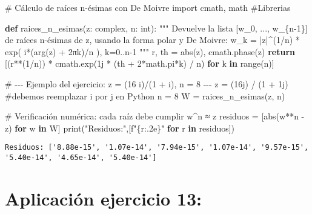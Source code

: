 \documentclass[
  letterpaper,
  DIV=11,
  numbers=noendperiod]{scrreprt}
\newenvironment{Shaded}{\begin{snugshade}}{\end{snugshade}}
\newcommand{\BuiltInTok}[1]{\textcolor[rgb]{0.00,0.23,0.31}{#1}}
\newcommand{\CommentTok}[1]{\textcolor[rgb]{0.37,0.37,0.37}{#1}}
\newcommand{\ControlFlowTok}[1]{\textcolor[rgb]{0.00,0.23,0.31}{\textbf{#1}}}
\newcommand{\DecValTok}[1]{\textcolor[rgb]{0.68,0.00,0.00}{#1}}
\newcommand{\ImportTok}[1]{\textcolor[rgb]{0.00,0.46,0.62}{#1}}
\newcommand{\KeywordTok}[1]{\textcolor[rgb]{0.00,0.23,0.31}{\textbf{#1}}}
\newcommand{\NormalTok}[1]{\textcolor[rgb]{0.00,0.23,0.31}{#1}}
\newcommand{\OperatorTok}[1]{\textcolor[rgb]{0.37,0.37,0.37}{#1}}
\newcommand{\OtherTok}[1]{\textcolor[rgb]{0.00,0.23,0.31}{#1}}
\newcommand{\SpecialCharTok}[1]{\textcolor[rgb]{0.37,0.37,0.37}{#1}}
\newcommand{\SpecialStringTok}[1]{\textcolor[rgb]{0.13,0.47,0.30}{#1}}
\newcommand{\StringTok}[1]{\textcolor[rgb]{0.13,0.47,0.30}{#1}}
\begin{document}
\begin{Shaded}
\begin{Highlighting}[]
\CommentTok{\# Cálculo de raíces n{-}ésimas con De Moivre}
\ImportTok{import}\NormalTok{ cmath, math }\CommentTok{\#Librerias}

\KeywordTok{def}\NormalTok{ raices\_n\_esimas(z: }\BuiltInTok{complex}\NormalTok{, n: }\BuiltInTok{int}\NormalTok{):}
    \CommentTok{"""}
\CommentTok{    Devuelve la lista [w\_0, ..., w\_\{n{-}1\}] de raíces n{-}ésimas de z,}
\CommentTok{    usando la forma polar y De Moivre:}
\CommentTok{       w\_k = |z|\^{}(1/n) * exp( i*(arg(z) + 2πk)/n ),  k=0..n{-}1}
\CommentTok{    """}
\NormalTok{    r, th }\OperatorTok{=} \BuiltInTok{abs}\NormalTok{(z), cmath.phase(z)}
    \ControlFlowTok{return}\NormalTok{ [(r}\OperatorTok{**}\NormalTok{(}\DecValTok{1}\OperatorTok{/}\NormalTok{n)) }\OperatorTok{*}\NormalTok{ cmath.exp(}\OtherTok{1j} \OperatorTok{*}\NormalTok{ (th }\OperatorTok{+} \DecValTok{2}\OperatorTok{*}\NormalTok{math.pi}\OperatorTok{*}\NormalTok{k) }\OperatorTok{/}\NormalTok{ n) }\ControlFlowTok{for}\NormalTok{ k }\KeywordTok{in} \BuiltInTok{range}\NormalTok{(n)]}

\CommentTok{\# {-}{-}{-} Ejemplo del ejercicio: z = (16 i)/(1 + i), n = 8 {-}{-}{-}}
\NormalTok{z }\OperatorTok{=}\NormalTok{ (}\OtherTok{16j}\NormalTok{) }\OperatorTok{/}\NormalTok{ (}\DecValTok{1} \OperatorTok{+} \OtherTok{1j}\NormalTok{) }\CommentTok{\#debemos reemplazar i por j en Python}
\NormalTok{n }\OperatorTok{=} \DecValTok{8}
\NormalTok{W }\OperatorTok{=}\NormalTok{ raices\_n\_esimas(z, n)}

\CommentTok{\# Verificación numérica: cada raíz debe cumplir w\^{}n ≈ z}
\NormalTok{residuos }\OperatorTok{=}\NormalTok{ [}\BuiltInTok{abs}\NormalTok{(w}\OperatorTok{**}\NormalTok{n }\OperatorTok{{-}}\NormalTok{ z) }\ControlFlowTok{for}\NormalTok{ w }\KeywordTok{in}\NormalTok{ W]}
\BuiltInTok{print}\NormalTok{(}\StringTok{"Residuos:"}\NormalTok{,[}\SpecialStringTok{f"}\SpecialCharTok{\{}\NormalTok{r}\SpecialCharTok{:.2e\}}\SpecialStringTok{"} \ControlFlowTok{for}\NormalTok{ r }\KeywordTok{in}\NormalTok{ residuos])}
\end{Highlighting}
\end{Shaded}

\begin{verbatim}
Residuos: ['8.88e-15', '1.07e-14', '7.94e-15', '1.07e-14', '9.57e-15', '5.40e-14', '4.65e-14', '5.40e-14']
\end{verbatim}

\section{Aplicación ejercicio 13:}\label{aplicaciuxf3n-ejercicio-13}
\end{document}
